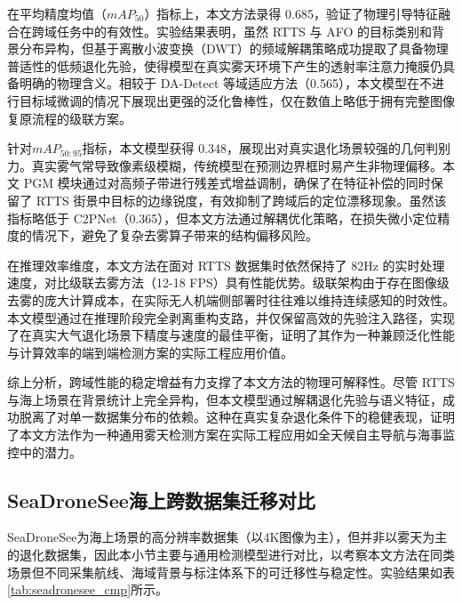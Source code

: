 在平均精度均值（$mAP_{50}$）指标上，本文方法录得 0.685，验证了物理引导特征融合在跨域任务中的有效性。实验结果表明，虽然 RTTS 与 AFO 的目标类别和背景分布异构，但基于离散小波变换（DWT）的频域解耦策略成功提取了具备物理普适性的低频退化先验，使得模型在真实雾天环境下产生的透射率注意力掩膜仍具备明确的物理含义。相较于 DA-Detect 等域适应方法（0.565），本文模型在不进行目标域微调的情况下展现出更强的泛化鲁棒性，仅在数值上略低于拥有完整图像复原流程的级联方案。

针对$mAP_{50:95}$指标，本文模型获得 0.348，展现出对真实退化场景较强的几何判别力。真实雾气常导致像素级模糊，传统模型在预测边界框时易产生非物理偏移。本文 PGM 模块通过对高频子带进行残差式增益调制，确保了在特征补偿的同时保留了 RTTS 街景中目标的边缘锐度，有效抑制了跨域后的定位漂移现象。虽然该指标略低于 C2PNet（0.365），但本文方法通过解耦优化策略，在损失微小定位精度的情况下，避免了复杂去雾算子带来的结构偏移风险。

在推理效率维度，本文方法在面对 RTTS 数据集时依然保持了 82Hz 的实时处理速度，对比级联去雾方法（12-18 FPS）具有性能优势。级联架构由于存在图像级去雾的庞大计算成本，在实际无人机端侧部署时往往难以维持连续感知的时效性。本文模型通过在推理阶段完全剥离重构支路，并仅保留高效的先验注入路径，实现了在真实大气退化场景下精度与速度的最佳平衡，证明了其作为一种兼顾泛化性能与计算效率的端到端检测方案的实际工程应用价值。

综上分析，跨域性能的稳定增益有力支撑了本文方法的物理可解释性。尽管 RTTS 与海上场景在背景统计上完全异构，但本文模型通过解耦退化先验与语义特征，成功脱离了对单一数据集分布的依赖。这种在真实复杂退化条件下的稳健表现，证明了本文方法作为一种通用雾天检测方案在实际工程应用如全天候自主导航与海事监控中的潜力。

\subsection{SeaDroneSee海上跨数据集迁移对比}
\label{subsec:seadronesee_cmp}

SeaDroneSee为海上场景的高分辨率数据集（以4K图像为主），但并非以雾天为主的退化数据集，因此本小节主要与通用检测模型进行对比，以考察本文方法在同类场景但不同采集航线、海域背景与标注体系下的可迁移性与稳定性。实验结果如表 \ref{tab:seadronesee_cmp}所示。

